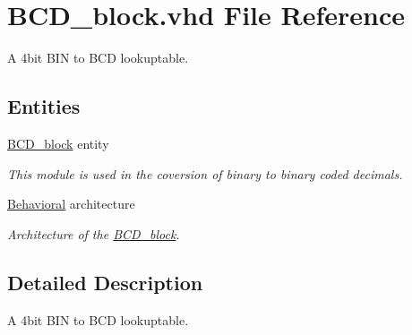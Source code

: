 \hypertarget{BCD__block_8vhd}{\section{B\-C\-D\-\_\-block.\-vhd File Reference}
\label{BCD__block_8vhd}
}


A 4bit B\-I\-N to B\-C\-D lookuptable.  


\subsection*{Entities}
\begin{DoxyCompactItemize}
\item 
\hyperlink{classBCD__block}{B\-C\-D\-\_\-block} entity
\begin{DoxyCompactList}\small\item\em This module is used in the coversion of binary to binary coded decimals. \end{DoxyCompactList}\item 
\hyperlink{classBCD__block_1_1Behavioral}{Behavioral} architecture
\begin{DoxyCompactList}\small\item\em Architecture of the \hyperlink{classBCD__block}{B\-C\-D\-\_\-block}. \end{DoxyCompactList}\end{DoxyCompactItemize}


\subsection{Detailed Description}
A 4bit B\-I\-N to B\-C\-D lookuptable. 
